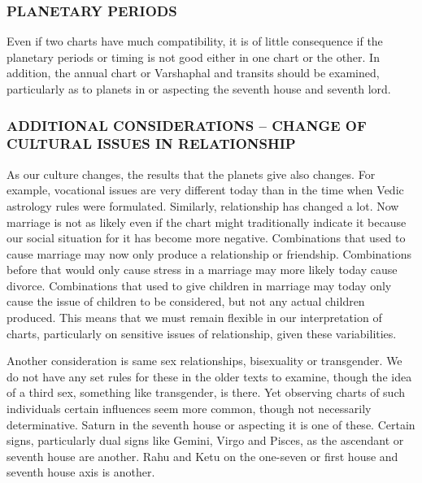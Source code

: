 \subsubsection{PLANETARY PERIODS}

 

Even if two charts have much compatibility, it is of little consequence if the planetary periods or timing is not good either in one chart or the other. In addition, the annual chart or Varshaphal and transits should be examined, particularly as to planets in or aspecting the seventh house and seventh lord.

 

\subsubsection{ADDITIONAL CONSIDERATIONS – CHANGE OF CULTURAL ISSUES IN RELATIONSHIP}

 

As our culture changes, the results that the planets give also changes. For example, vocational issues are very different today than in the time when Vedic astrology rules were formulated. Similarly, relationship has changed a lot. Now marriage is not as likely even if the chart might traditionally indicate it because our social situation for it has become more negative. Combinations that used to cause marriage may now only produce a relationship or friendship. Combinations before that would only cause stress in a marriage may more likely today cause divorce. Combinations that used to give children in marriage may today only cause the issue of children to be considered, but not any actual children produced. This means that we must remain flexible in our interpretation of charts, particularly on sensitive issues of relationship, given these variabilities.

 

Another consideration is same sex relationships, bisexuality or transgender. We do not have any set rules for these in the older texts to examine, though the idea of a third sex, something like transgender, is there. Yet observing charts of such individuals certain influences seem more common, though not necessarily determinative. Saturn in the seventh house or aspecting it is one of these. Certain signs, particularly dual signs like Gemini, Virgo and Pisces, as the ascendant or seventh house are another. Rahu and Ketu on the one-seven or first house and seventh house axis is another.

 

